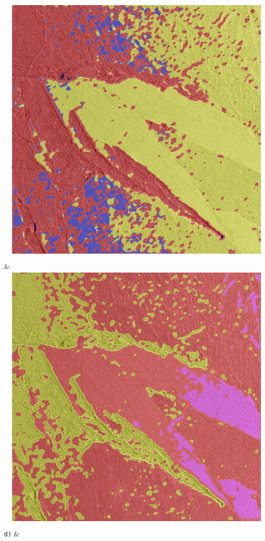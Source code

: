 \begin{table}[h!]
\begin{tabularx}{\textwidth}
		\includegraphics[width=0.9\linewidth]{images/gen/convolution_number/p03_03.png_5.png} &
		\includegraphics[width=0.9\linewidth]{images/gen/convolution_number/p03_03.png_6.png} \\
		\texttt{d)} &

\end{tabularx}
\end{table}
